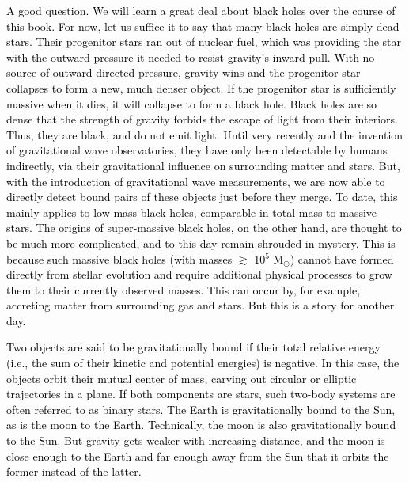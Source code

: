 \documentclass[main.tex]{subfiles}
\begin{document}
\begin{tcolorbox}[sharp corners, colback=red!30, colframe=red!80!blue, title=Box \refstepcounter{educhap1}\label{boxchap1:bhs}\ref{boxchap1:bhs} -- Black Holes]
\par \textcolor{black} {A good question.  We will learn a great deal about black holes over the course of this book.  For now, let us suffice it to say that many black holes are simply dead stars. Their progenitor stars ran out of nuclear fuel, which was providing the star with the outward pressure it needed to resist gravity's inward pull.  With no source of outward-directed pressure, gravity wins and the progenitor star collapses to form a new, much denser object.  If the progenitor star is sufficiently massive when it dies, it will collapse to form a black hole.  %
Black holes are so dense that the strength of gravity forbids the escape of light from their interiors.  Thus, they are black, and do not emit light.  Until very recently and the invention of gravitational wave observatories, they have only been detectable by humans indirectly, via their gravitational influence on surrounding matter and stars.  But, with the introduction of gravitational wave measurements, we are now able to directly detect bound pairs of these objects just before they merge.  To date, this mainly applies to low-mass black holes, comparable in total mass to massive stars.  The origins of super-massive black holes, on the other hand, are thought to be much more complicated, and to this day remain shrouded in mystery.  This is because such massive black holes (with masses $\gtrsim$ 10$^5$ M$_{\odot}$) cannot have formed directly from stellar evolution and require additional physical processes to grow them to their currently observed masses.  This can occur by, for example, accreting matter from surrounding gas and stars.  But this is a story for another day.}
\end{tcolorbox}

\begin{tcolorbox}[sharp corners, colback=blue!30, colframe=blue!80!blue, title=Box \refstepcounter{educhap1}\label{boxchap1:bs}\ref{boxchap1:bs} -- Gravitationally Bound Pairs of Objects and Binary Star Systems]
\par \textcolor{black} {Two objects are said to be gravitationally bound if their total relative energy (i.e., the sum of their kinetic and potential energies) is negative.  In this case, the objects orbit their mutual center of mass, carving out circular or elliptic trajectories in a plane.  If both components are stars, such two-body systems are often referred to as binary stars.  The Earth is gravitationally bound to the Sun, as is the moon to the Earth.  Technically, the moon is also gravitationally bound to the Sun.  But gravity gets weaker with increasing distance, and the moon is close enough to the Earth and far enough away from the Sun that it orbits the former instead of the latter.}  
\end{tcolorbox}
\end{document}
